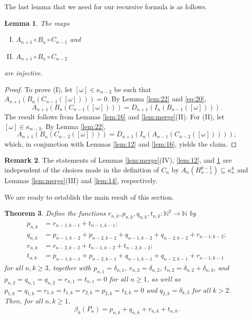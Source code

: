 \documentclass[12pt]{amsart}
\newtheorem{theorem}{Theorem}[section]
\newtheorem{lem}[theorem]{Lemma}
\theoremstyle{definition}
\newtheorem{rem}[theorem]{Remark}
\begin{document}
The last lemma that we need for our recursive formula is as follows.

\begin{lem}\label{lem:15} The maps
\begin{enumerate}[(I)]
\item $A_{n+1}\circ B_n\circ C_{n-1}$ and
\item $A_{n+1}\circ B_n\circ C_{n-2}$ 
\end{enumerate}
are injective.
\end{lem}

\begin{proof} To prove (I), let $[\omega]\in\kappa_{n-2}$ be such that $A_{n+1}(B_n(C_{n-1}([\omega])))=0$. By Lemma \ref{lem:22} and \eqref{eq:20},
\[
A_{n+1}(B_n(C_{n-1}([\omega])))=D_{n+1}(I_n(B_{n-1}([\omega]))).
\]
The result follows from Lemmas \ref{lem:16} and \ref{lem:merge}(II). For (II), let $[\omega]\in\kappa_{n-3}$. By Lemma \ref{lem:22},
\[
A_{n+1}(B_n(C_{n-2}([\omega]))) = D_{n+1}(I_n(A_{n-1}(C_{n-2}([\omega])))),
\]
which, in conjunction with Lemmas \ref{lem:12} and \ref{lem:16}, yields the claim.
\end{proof}

\begin{rem}
The statements of Lemmas \ref{lem:merge}(IV), \ref{lem:12}, and \ref{lem:15} are independent of the choices made in the definition of $C_n$ by $A_n(H_{n-1}^{k-1})\subseteq \kappa_n^k$ and Lemmas \ref{lem:merge}(III) and \ref{lem:14}, respectively.
\end{rem}

We are ready to establish the main result of this section.

\begin{theorem}\label{recursionprop}
Define the functions $r_{n,k},p_{n,k},q_{n,k},t_{n,k} \colon \mathbb N^2\to \mathbb N$ by 
\begin{align}
p_{n,k} & = r_{n-1,k-1}+t_{n-1,k-1}\label{eq:p};\\ 
q_{n,k} & = p_{n-1,k-2}+p_{n-2,k-2}+q_{n-1,k-2}+q_{n-2,k-2}+r_{n-1,k-2}\label{eq:q};\\
r_{n,k} & = r_{n-2,k-2} + t_{n-1,k-2} + t_{n-2,k-2}\label{eq:r};\\
t_{n,k} & = p_{n-1,k-1} + p_{n-2,k-1} + q_{n-1,k-1} + q_{n-2,k-1}+ r_{n-1,k-1}\label{eq:t}
\end{align}
for all $n,k\ge 3$, together with $p_{n,1}=\delta_{n,1}$, $r_{n,2}=\delta_{n,2}$, $t_{n,2}=\delta_{n,2}+\delta_{n,3}$, and $p_{n,2}=q_{n,1}=q_{n,2}=r_{n,1}=t_{n,1}=0$ for all $n\ge 1$, as well as $p_{1,k}=q_{1,k}=r_{1,k}=t_{1,k}=r_{2,k}=p_{2,k}=t_{2,k}=0$ and $q_{2,k}=\delta_{k,3}$ for all $k>2$. Then, for all $n,k\ge 1$,
\[\beta_k(P_n)=p_{n,k}+q_{n,k}+r_{n,k}+t_{n,k}.\]
\end{theorem}
\end{document}
